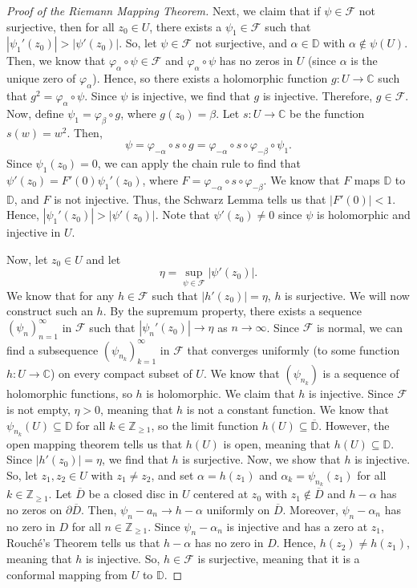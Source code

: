 \documentclass[a4paper, openany]{memoir}
\theoremstyle{definition}
\theoremstyle{plain}
\begin{document}
\begin{proof}[Proof of the Riemann Mapping Theorem]
        Next, we claim that if $\psi \in \mathcal{F}$ not surjective, then for all $z_0 \in U$, there exists a $\psi_1 \in \mathcal{F}$ such that $|\psi_1'(z_0)| > |\psi'(z_0)|$. So, let $\psi \in \mathcal{F}$ not surjective, and $\alpha \in \mathbb{D}$ with $\alpha \not\in \psi(U)$. Then, we know that $\varphi_\alpha \circ \psi \in \mathcal{F}$ and $\varphi_\alpha \circ \psi$ has no zeros in $U$ (since $\alpha$ is the unique zero of $\varphi_\alpha$). Hence, so there exists a holomorphic function $g \colon U \to \mathbb{C}$ such that $g^2 = \varphi_\alpha \circ \psi$. Since $\psi$ is injective, we find that $g$ is injective. Therefore, $g \in \mathcal{F}$. Now, define $\psi_1 = \varphi_\beta \circ g$, where $g(z_0) = \beta$. Let $s \colon U \to \mathbb{C}$ be the function $s(w) = w^2$. Then,
        \[\psi = \varphi_{-\alpha} \circ s \circ g = \varphi_{-\alpha} \circ s \circ \varphi_{-\beta} \circ \psi_1.\]
        Since $\psi_1(z_0) = 0$, we can apply the chain rule to find that $
        \psi'(z_0) = F'(0) \psi_1'(z_0)$, where $F = \varphi_{-\alpha} \circ s \circ \varphi_{-\beta}$. We know that $F$ maps $\mathbb{D}$ to $\mathbb{D}$, and $F$ is not injective. Thus, the Schwarz Lemma tells us that $|F'(0)| < 1$. Hence, $|\psi_1'(z_0)| > |\psi'(z_0)|$. Note that $\psi'(z_0) \neq 0$ since $\psi$ is holomorphic and injective in $U$.

        Now, let $z_0 \in U$ and let
        \[\eta = \sup_{\psi \in \mathcal{F}} |\psi'(z_0)|.\]
        We know that for any $h \in \mathcal{F}$ such that $|h'(z_0)| = \eta$, $h$ is surjective. We will now construct such an $h$. By the supremum property, there exists a sequence $(\psi_n)_{n=1}^\infty$ in $\mathcal{F}$ such that $|\psi_n'(z_0)| \to \eta$ as $n \to \infty$. Since $\mathcal{F}$ is normal, we can find a subsequence $(\psi_{n_k})_{k=1}^\infty$ in $\mathcal{F}$ that converges uniformly (to some function $h \colon U \to \mathbb{C}$) on every compact subset of $U$. We know that $(\psi_{n_k})$ is a sequence of holomorphic functions, so $h$ is holomorphic. We claim that $h$ is injective. Since $\mathcal{F}$ is not empty, $\eta > 0$, meaning that $h$ is not a constant function. We know that $\psi_{n_k}(U) \subseteq \mathbb{D}$ for all $k \in \mathbb{Z}_{\geq 1}$, so the limit function $h(U) \subseteq \overline{\mathbb{D}}$. However, the open mapping theorem tells us that $h(U)$ is open, meaning that $h(U) \subseteq \mathbb{D}$. Since $|h'(z_0)| = \eta$, we find that $h$ is surjective. Now, we show that $h$ is injective. So, let $z_1, z_2 \in U$ with $z_1 \neq z_2$, and set $\alpha = h(z_1)$ and $\alpha_k = \psi_{n_k}(z_1)$ for all $k \in \mathbb{Z}_{\geq 1}$. Let $\overline{D}$ be a closed disc in $U$ centered at $z_0$ with $z_1 \not\in \overline{D}$ and $h - \alpha$ has no zeros on $\partial \overline{D}$. Then, $\psi_n - a_n \to h - \alpha$ uniformly on $\overline{D}$. Moreover, $\psi_n - \alpha_n$ has no zero in $D$ for all $n \in \mathbb{Z}_{\geq 1}$. Since $\psi_n - \alpha_n$ is injective and has a zero at $z_1$, Rouché's Theorem tells us that $h - \alpha$ has no zero in $D$. Hence, $h(z_2) \neq h(z_1)$, meaning that $h$ is injective. So, $h \in \mathcal{F}$ is surjective, meaning that it is a conformal mapping from $U$ to $\mathbb{D}$.
    \end{proof}
\end{document}
